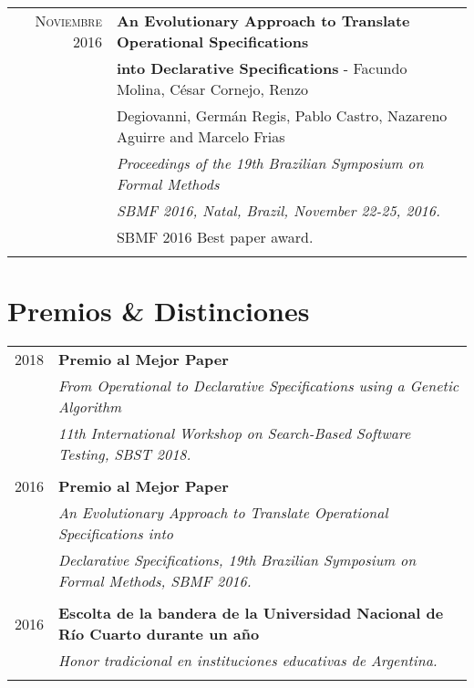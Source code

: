 \documentclass[a4paper,10pt]{article} %
\begin{document}
\begin{longtable}{rl}
\textsc{Noviembre} 2016 & \textbf{An Evolutionary Approach to Translate Operational Specifications} \\ & \textbf{into Declarative Specifications} - Facundo Molina, César Cornejo, Renzo \\
& Degiovanni, Germán Regis, Pablo Castro, Nazareno Aguirre and Marcelo Frias \\
& \textit{Proceedings of the 19th Brazilian Symposium on Formal Methods} \\ 
& \textit{SBMF 2016, Natal, Brazil, November 22-25, 2016.} \\ 
& SBMF 2016 Best paper award. \\ & \\

\end{longtable}

\section{Premios \& Distinciones}
\begin{tabular}{rl}
\\
\textsc{2018} & \textbf{Premio al Mejor Paper} \\ 
& \textit{From Operational to Declarative Specifications using a Genetic Algorithm} \\
& \textit{11th International Workshop on Search-Based Software Testing, SBST 2018.} \\ & \\

\textsc{2016} & \textbf{Premio al Mejor Paper} \\ 
& \textit{An Evolutionary Approach to Translate Operational Specifications into } \\
& \textit{Declarative Specifications, 19th Brazilian Symposium on Formal Methods, SBMF 2016.} \\ & \\

\textsc{2016} & \textbf{Escolta de la bandera de la Universidad Nacional de Río Cuarto durante un año} \\ 
& \textit{Honor tradicional en instituciones educativas de Argentina.} \\ & \\
\end{tabular}
\end{document}
